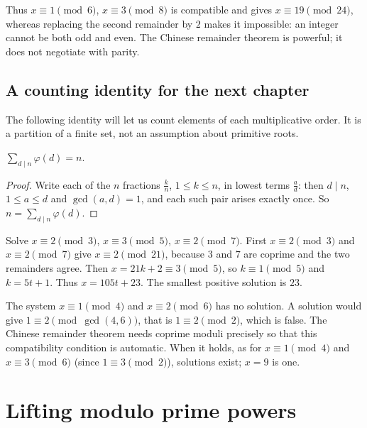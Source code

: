 Thus $x\equiv1\pmod6$, $x\equiv3\pmod8$ is compatible and gives $x\equiv19\pmod{24}$, whereas replacing the second remainder by $2$ makes it impossible: an integer cannot be both odd and even. The Chinese remainder theorem is powerful; it does not negotiate with parity.

\subsection*{A counting identity for the next chapter}
The following identity will let us count elements of each multiplicative order.
It is a partition of a finite set, not an assumption about primitive roots.

\begin{proposition}[Gauss]\label{prop:phisum}
$\displaystyle\sum_{d\mid n}\varphi(d)=n$.
\end{proposition}
\begin{proof}
Write each of the $n$ fractions $\frac kn$, $1\le k\le n$, in lowest terms $\frac ad$: then $d\mid n$, $1\le a\le d$ and $\gcd(a,d)=1$, and each such pair arises exactly once. So $n=\sum_{d\mid n}\varphi(d)$.
\end{proof}

\begin{examplex}
Solve $x\equiv 2\pmod 3$, $x\equiv 3\pmod 5$, $x\equiv 2\pmod 7$. First $x\equiv 2\pmod 3$ and $x\equiv 2\pmod 7$ give $x\equiv 2\pmod{21}$, because $3$ and $7$ are coprime and the two remainders agree. Then $x=21k+2\equiv 3\pmod 5$, so $k\equiv 1\pmod 5$ and $k=5t+1$. Thus $x=105t+23$. The smallest positive solution is $23$.
\end{examplex}

\begin{examplex}
The system $x\equiv 1\pmod 4$ and $x\equiv 2\pmod 6$ has no solution. A solution would give $1\equiv 2\pmod{\gcd(4,6)}$, that is $1\equiv 2\pmod 2$, which is false. The Chinese remainder theorem needs coprime moduli precisely so that this compatibility condition is automatic. When it holds, as for $x\equiv 1\pmod 4$ and $x\equiv 3\pmod 6$ (since $1\equiv 3\pmod 2$), solutions exist; $x=9$ is one.
\end{examplex}

\section{Lifting modulo prime powers}


